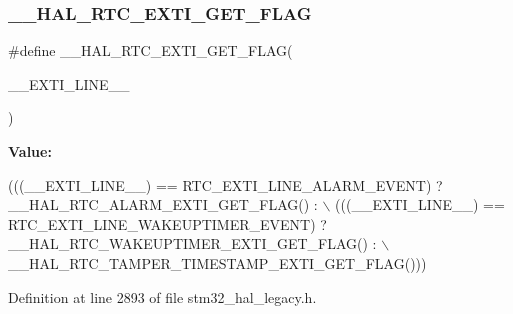\subsubsection{\texorpdfstring{\+\_\+\+\_\+\+H\+A\+L\+\_\+\+R\+T\+C\+\_\+\+E\+X\+T\+I\+\_\+\+G\+E\+T\+\_\+\+F\+L\+AG}{\_\_HAL\_RTC\_EXTI\_GET\_FLAG}}
{\footnotesize\ttfamily \#define \+\_\+\+\_\+\+H\+A\+L\+\_\+\+R\+T\+C\+\_\+\+E\+X\+T\+I\+\_\+\+G\+E\+T\+\_\+\+F\+L\+AG(\begin{DoxyParamCaption}\item[{}]{\+\_\+\+\_\+\+E\+X\+T\+I\+\_\+\+L\+I\+N\+E\+\_\+\+\_\+ }\end{DoxyParamCaption})}

{\bfseries Value\+:}
\begin{DoxyCode}
(((\_\_EXTI\_LINE\_\_) == RTC\_EXTI\_LINE\_ALARM\_EVENT) ? \_\_HAL\_RTC\_ALARM\_EXTI\_GET\_FLAG() : \(\backslash\)
                                                  (((\_\_EXTI\_LINE\_\_) == RTC\_EXTI\_LINE\_WAKEUPTIMER\_EVENT) ? 
      \_\_HAL\_RTC\_WAKEUPTIMER\_EXTI\_GET\_FLAG() : \(\backslash\)
                                                      \_\_HAL\_RTC\_TAMPER\_TIMESTAMP\_EXTI\_GET\_FLAG()))
\end{DoxyCode}


Definition at line 2893 of file stm32\+\_\+hal\+\_\+legacy.\+h.


